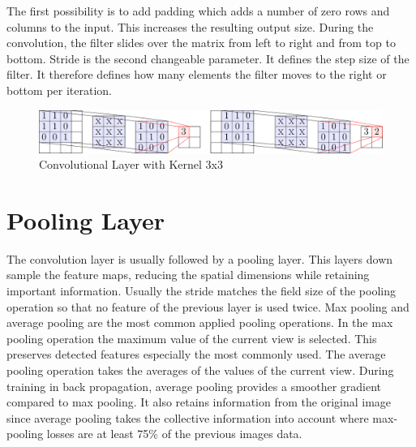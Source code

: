 \documentclass[
a4paper, 
12pt,
grayscalebody, %
abstract=on,
twoside, BCOR10mm, 12pt, DIV13,headinclude, footexclude, final, abstracton, openright
]{ibireprt}
\numberwithin{equation}{chapter}
\numberwithin{table}{chapter}
\numberwithin{figure}{chapter}
\numberwithin{algorithm}{chapter}
\numberwithin{example}{chapter}
\numberwithin{example}{chapter}
\begin{document}
 The first possibility is to add padding which adds a number of zero rows and columns to the input. This increases the resulting output size. During the convolution, the filter slides over the matrix from left to right and from top to bottom. Stride is the second changeable parameter. It defines the step size of the filter. It therefore defines how many elements the filter moves to the right or bottom per iteration.
  
  
\begin{figure}[h]
	\center
	\includegraphics[width = 1 \textwidth]{3x3_conv_layer.png}%
	\caption{Convolutional Layer with Kernel 3x3 \cite{Walle2023}}
	\label{fig:fig2}
\end{figure}

\section{Pooling Layer}
The convolution layer is usually followed by a pooling layer. This layers down sample the feature maps, reducing the spatial dimensions while retaining important information. Usually the stride matches the field size of the pooling operation so that no feature of the previous layer is used twice. Max pooling and average pooling are the most common applied pooling operations. In the max pooling operation the maximum value of the current view is selected. This preserves detected features especially the most commonly used. The average pooling operation takes the averages of the values of the current view. During training in back propagation, average pooling provides a smoother gradient compared to max pooling. It also retains information from the original image since average pooling takes the collective information into account where max-pooling losses are at least 75\% of the previous images data. 
\end{document}
